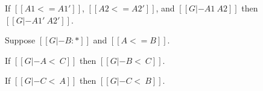 \begin{corollary}
  \label{corollary:congruence_of_type_consistency_along_type_precision}
  If $[[A1 <= A1']]$, $[[A2 <= A2']]$, and $[[G |- A1 ~ A2]]$ then
  $[[G |- A1' ~ A2']]$.  
\end{corollary}

\begin{lemma}
  \label{lemma:congruence_of_subtyping_along_type_precision}
  Suppose $[[G |- B : *]]$ and $[[A <= B]]$.
  \begin{enumR}
  \item If $[[G |- A <~ C]]$ then $[[G |- B <~ C]]$.

  \item If $[[G |- C <~ A]]$ then $[[G |- C <~ B]]$.  
  \end{enumR}
\end{lemma}
